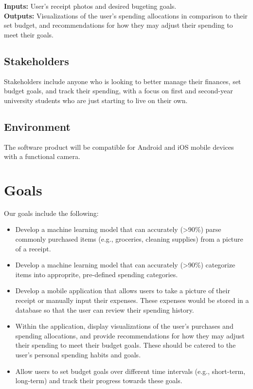 \documentclass{article}
\begin{document}

\textbf{Inputs:} User's receipt photos and desired bugeting goals.\\
\textbf{Outputs:} Visualizations of the user's spending allocations in
comparison to their set budget, and recommendations for how they may adjust
their spending to meet their goals.

\subsection{Stakeholders}

Stakeholders include anyone who is looking to better manage their finances, set
budget goals, and track their spending, with a focus on first and second-year
university students who are just starting to live on their own.

\subsection{Environment}


The software product will be compatible for Android and iOS mobile devices with
a functional camera.

\section{Goals}

Our goals include the following:
\begin{itemize}
    \item Develop a machine learning model that can accurately
    (\textgreater90\%) parse commonly purchased items (e.g., groceries, cleaning
    supplies) from a picture of a receipt.
    \item Develop a machine learning model that can accurately
    (\textgreater90\%) categorize items into approprite, pre-defined spending
    categories. 
    \item Develop a mobile application that allows users to take a picture of
    their receipt or manually input their expenses. These expenses would be
    stored in a database so that the user can review their spending history.
    \item Within the application, display visualizations of the user's purchases
    and spending allocations, and provide recommendations for how they may
    adjust their spending to meet their budget goals. These should be catered to
    the user's personal spending habits and goals.
    \item Allow users to set budget goals over different time intervals (e.g.,
    short-term, long-term) and track their progress towards these goals.
\end{itemize}
\end{document}
